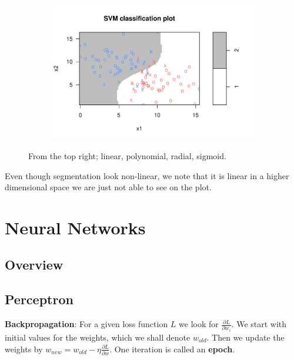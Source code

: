 \documentclass[aspectratio=169,10pt]{beamer}
\begin{document}
\begin{frame}{\secname}{\subsecname}
\begin{figure}
\begin{subfigure}[t]{.45\textwidth}
      \centering
      \includegraphics[width=.65\textwidth]{scripts/output/sigmoid_kernel.pdf}
    \end{subfigure}
    \caption{From the top right; linear, polynomial, radial, sigmoid.}
  \end{figure}
\end{frame}

\begin{frame}{\secname}{\subsecname}
  Even though segmentation look non-linear, we note that it is linear in a higher dimensional space we are just not able to see on the plot.
\end{frame}

\section{Neural Networks}

\subsection{Overview}
\begin{frame}{\secname}{\subsecname}
  
\end{frame}

\subsection{Perceptron}
\begin{frame}{\secname}{\subsecname}
    \textbf{Backpropagation}: For a given loss function $L$ we look for $\frac{\partial L}{\partial w_i}$.
    We start with initial values for the weights, which we shall denote $w_{old}$.
    Then we update the weights by $w_{new} = w_{old} - \eta \frac{\partial L}{\partial w}$.
    One iteration is called an \textbf{epoch}.
\end{frame}

{\aauwavesbg
\begin{frame}
\end{frame}}
\end{document}
